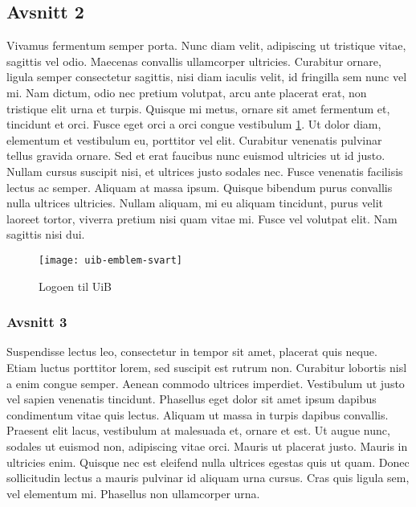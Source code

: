 \documentclass[12pt]{article}
\begin{document}
\subsection{Avsnitt 2}
\label{sec-1-1}
Vivamus fermentum semper porta. Nunc diam velit, adipiscing ut tristique vitae, sagittis vel odio. Maecenas convallis ullamcorper ultricies. Curabitur ornare, ligula semper consectetur sagittis, nisi diam iaculis velit, id fringilla sem nunc vel mi. Nam dictum, odio nec pretium volutpat, arcu ante placerat erat, non tristique elit urna et turpis. Quisque mi metus, ornare sit amet fermentum et, tincidunt et orci. Fusce eget orci a orci congue vestibulum \ref{fig:logo}. Ut dolor diam, elementum et vestibulum eu, porttitor vel elit. Curabitur venenatis pulvinar tellus gravida ornare. Sed et erat faucibus nunc euismod ultricies ut id justo. Nullam cursus suscipit nisi, et ultrices justo sodales nec. Fusce venenatis facilisis lectus ac semper. Aliquam at massa ipsum. Quisque bibendum purus convallis nulla ultrices ultricies. Nullam aliquam, mi eu aliquam tincidunt, purus velit laoreet tortor, viverra pretium nisi quam vitae mi. Fusce vel volutpat elit. Nam sagittis nisi dui.


\begin{figure}[htbp]
\centering
\texttt{[image: uib-emblem-svart]}
\caption{Logoen til UiB}
\label{fig:logo}
\end{figure}


\subsubsection{Avsnitt 3}
\label{sec-1-1-1}
Suspendisse lectus leo, consectetur in tempor sit amet, placerat quis neque. Etiam luctus porttitor lorem, sed suscipit est rutrum non. Curabitur lobortis nisl a enim congue semper. Aenean commodo ultrices imperdiet. Vestibulum ut justo vel sapien venenatis tincidunt. Phasellus eget dolor sit amet ipsum dapibus condimentum vitae quis lectus. Aliquam ut massa in turpis dapibus convallis. Praesent elit lacus, vestibulum at malesuada et, ornare et est. Ut augue nunc, sodales ut euismod non, adipiscing vitae orci. Mauris ut placerat justo. Mauris in ultricies enim. Quisque nec est eleifend nulla ultrices egestas quis ut quam. Donec sollicitudin lectus a mauris pulvinar id aliquam urna cursus. Cras quis ligula sem, vel elementum mi. Phasellus non ullamcorper urna.
\end{document}
